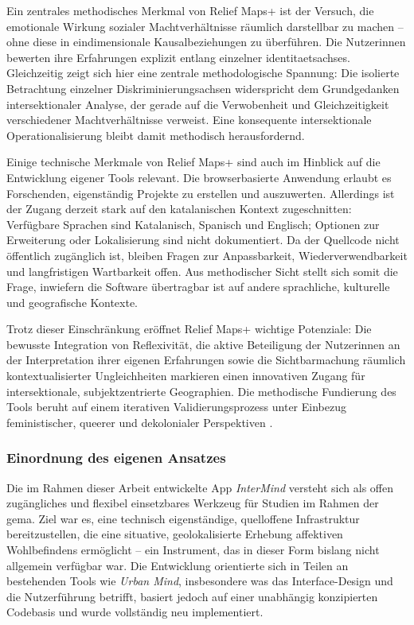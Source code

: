 Ein zentrales methodisches Merkmal von Relief Maps+ ist der Versuch, die emotionale Wirkung sozialer Machtverhältnisse räumlich darstellbar zu machen – ohne diese in eindimensionale Kausalbeziehungen zu überführen. Die Nutzer\genderstern innen bewerten ihre Erfahrungen explizit entlang einzelner \glspl{identitaetsachse}. Gleichzeitig zeigt sich hier eine zentrale methodologische Spannung: Die isolierte Betrachtung einzelner Diskriminierungsachsen widerspricht dem Grundgedanken intersektionaler Analyse, der gerade auf die Verwobenheit und Gleichzeitigkeit verschiedener Machtverhältnisse verweist. Eine konsequente intersektionale Operationalisierung bleibt damit methodisch herausfordernd.

Einige technische Merkmale von Relief Maps+ sind auch im Hinblick auf die Entwicklung eigener Tools relevant. Die browserbasierte Anwendung erlaubt es Forschenden, eigenständig Projekte zu erstellen und auszuwerten. Allerdings ist der Zugang derzeit stark auf den katalanischen Kontext zugeschnitten: Verfügbare Sprachen sind Katalanisch, Spanisch und Englisch; Optionen zur Erweiterung oder Lokalisierung sind nicht dokumentiert. Da der Quellcode nicht öffentlich zugänglich ist, bleiben Fragen zur Anpassbarkeit, Wiederverwendbarkeit und langfristigen Wartbarkeit offen. Aus methodischer Sicht stellt sich somit die Frage, inwiefern die Software übertragbar ist auf andere sprachliche, kulturelle und geografische Kontexte.

Trotz dieser Einschränkung eröffnet Relief Maps+ wichtige Potenziale: Die bewusste Integration von Reflexivität, die aktive Beteiligung der Nutzer\genderstern innen an der Interpretation ihrer eigenen Erfahrungen sowie die Sichtbarmachung räumlich kontextualisierter Ungleichheiten markieren einen innovativen Zugang für intersektionale, subjektzentrierte Geographien. Die methodische Fundierung des Tools beruht auf einem iterativen Validierungsprozess unter Einbezug feministischer, queerer und dekolonialer Perspektiven \parencite{luizdesouzaSpiralValidationProcess2025}.



\subsubsection{Einordnung des eigenen Ansatzes}

Die im Rahmen dieser Arbeit entwickelte App \textit{InterMind} versteht sich als offen zugängliches und flexibel einsetzbares Werkzeug für Studien im Rahmen der \acrshort{gema}. Ziel war es, eine technisch eigenständige, quelloffene Infrastruktur bereitzustellen, die eine situative, geolokalisierte Erhebung affektiven Wohlbefindens ermöglicht – ein Instrument, das in dieser Form bislang nicht allgemein verfügbar war. Die Entwicklung orientierte sich in Teilen an bestehenden Tools wie \textit{Urban Mind}, insbesondere was das Interface-Design und die Nutzerführung betrifft, basiert jedoch auf einer unabhängig konzipierten Codebasis und wurde vollständig neu implementiert.


